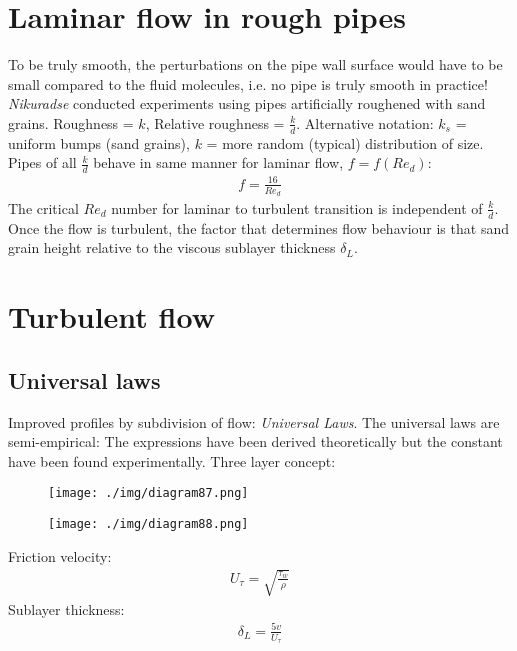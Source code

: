 \section{Laminar flow in rough pipes}
To be truly smooth, the perturbations on the pipe wall surface would have to be small compared to the fluid molecules, i.e. no pipe is truly smooth in practice! \textit{Nikuradse} conducted experiments using pipes artificially roughened with sand grains. Roughness = $k$, Relative roughness = $\frac{k}{d}$. Alternative notation: $k_s$ = uniform bumps (sand grains), $k$ = more random (typical) distribution of size. Pipes of all $\frac{k}{d}$ behave in same manner for laminar flow, $f = f\left(Re_d\right)$:
\begin{align}
  f = \frac{16}{Re_d}
\end{align}
The critical $Re_d$ number for laminar to turbulent transition is independent of $\frac{k}{d}$. Once the flow is turbulent, the factor that determines flow behaviour is that sand grain height relative to the viscous sublayer thickness $\delta_L$.
\section{Turbulent flow}
\subsection{Universal laws}
Improved profiles by subdivision of flow: \textit{Universal Laws}. The universal laws are semi-empirical: The expressions have been derived theoretically but the constant have been found experimentally. Three layer concept:
\begin{figure}[H]
  \centering
  \texttt{[image: ./img/diagram87.png]}
  \caption{}
\end{figure}
\begin{figure}[H]
  \centering
  \texttt{[image: ./img/diagram88.png]}
  \caption{}
\end{figure}
Friction velocity:
\begin{align}
  U_{\tau} = \sqrt{\frac{\tau_w}{\rho}}
\end{align}
Sublayer thickness:
\begin{align}
  \delta_L = \frac{5v}{U_{\tau}}
\end{align}
